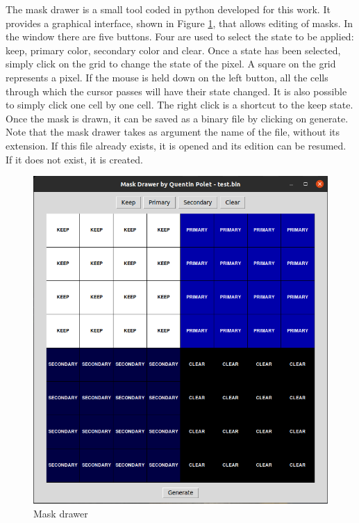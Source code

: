 The mask drawer is a small tool coded in python developed for this work. It provides a graphical 
interface, shown in Figure \ref{fig:tools/mask_drawer}, that allows editing of masks. In the window 
there are five buttons. 
Four are used to select the state to be applied: keep, primary color, secondary color and clear. 
Once a state has been selected, simply click on the grid to change the state of the pixel. A square 
on the grid represents a pixel. If the mouse is held down on the left button, all the cells through 
which the cursor passes will have their state changed. It is also possible to simply click one cell 
by one cell. The right click is a shortcut to the keep state. Once the mask is drawn, it can be 
saved as a binary file by clicking on generate. Note that the mask drawer takes as argument the 
name of the file, without its extension. If this file already exists, it is opened and its edition 
can be resumed. If it does not exist, it is created. 

\begin{figure}[H]
    \centering
    \includegraphics[scale=0.5]{Chapter7-Tools-Demos/res/mask_drawer.png}
    \caption{Mask drawer}
    \label{fig:tools/mask_drawer}
\end{figure}

